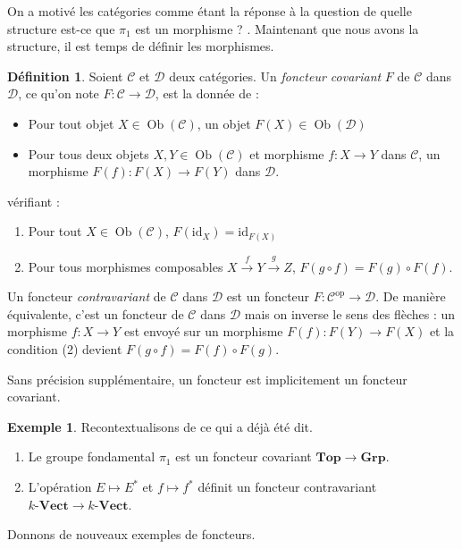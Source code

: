 \documentclass{article}
\newcommand{\id}{\mathrm{id}}
\newcommand{\op}{\mathrm{op}}
\newcommand{\cat}{\mathcal{C}}
\newcommand{\catt}{\mathcal{D}}
\newcommand{\Top}{\mathbf{Top}}
\newcommand{\Grp}{\mathbf{Grp}}
\newcommand{\Vectcat}{\mathbf{Vect}}
\DeclareMathOperator{\Ob}{Ob}
\theoremstyle{plain}
\theoremstyle{definition}
\newtheorem{definition}[theorem]{Définition}
\newtheorem{example}[theorem]{Exemple}
\theoremstyle{remark}
\begin{document}
On a motivé les catégories comme étant la réponse à la question \og de quelle structure est-ce que $\pi_1$ est un morphisme ? \fg. Maintenant que nous avons la structure, il est temps de définir les morphismes.

\begin{definition}
    Soient $\cat$ et $\catt$ deux catégories. Un \emph{foncteur covariant} $F$ de $\cat$ dans $\catt$, ce qu'on note $F : \cat \to \catt$, est la donnée de :
    \begin{itemize}
        \item Pour tout objet $X \in \Ob(\cat)$, un objet $F(X) \in \Ob(\catt)$
        \item Pour tous deux objets $X,Y \in \Ob(\cat)$ et morphisme $f : X \to Y$ dans $\cat$, un morphisme $F(f) : F(X) \to F(Y)$ dans $\catt$.
    \end{itemize}
    vérifiant :
    \begin{enumerate}
        \item Pour tout $X \in \Ob(\cat)$, $F(\id_X) = \id_{F(X)}$
        \item Pour tous morphismes composables $X \xrightarrow{f} Y \xrightarrow{g} Z$, $F(g \circ f) = F(g) \circ F(f)$.
    \end{enumerate}
    Un foncteur \emph{contravariant} de $\cat$ dans $\catt$ est un foncteur $F : \cat^\op \to \catt$. De manière équivalente, c'est un foncteur de $\cat$ dans $\catt$ mais on inverse le sens des flèches : un morphisme $f : X\to Y$ est envoyé sur un morphisme $F(f) : F(Y) \to F(X)$ et la condition (2) devient $F(g\circ f) = F(f) \circ F(g)$.
\end{definition}

Sans précision supplémentaire, \og un foncteur \fg est implicitement un foncteur covariant.

\begin{example} Recontextualisons de ce qui a déjà été dit.
    \begin{enumerate}
        \item Le groupe fondamental $\pi_1$ est un foncteur covariant $\Top \to \Grp$. 
        \item L'opération $E \mapsto E^*$ et $f \mapsto f^*$ définit un foncteur contravariant $k\text{-}\Vectcat \to k\text{-}\Vectcat$.
    \end{enumerate}
\end{example}

Donnons de nouveaux exemples de foncteurs.
\end{document}
